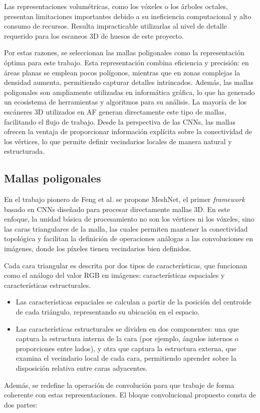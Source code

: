Las representaciones volumétricas, como los vóxeles o los árboles octales, presentan limitaciones importantes debido a su ineficiencia computacional y alto consumo de recursos. Resulta impracticable utilizarlas al nivel de detalle requerido para los escaneos 3D de huesos de este proyecto.

Por estas razones, se seleccionan las mallas poligonales como la representación óptima para este trabajo. Esta representación combina eficiencia y precisión: en áreas planas se emplean pocos polígonos, mientras que en zonas complejas la densidad aumenta, permitiendo capturar detalles intrincados. Además, las mallas poligonales son ampliamente utilizadas en informática gráfica, lo que ha generado un ecosistema de herramientas y algoritmos para su análisis. La mayoría de los escáneres 3D utilizados en AF generan directamente este tipo de mallas, facilitando el flujo de trabajo. Desde la perspectiva de las CNNs, las mallas ofrecen la ventaja de proporcionar información explícita sobre la conectividad de los vértices, lo que permite definir vecindarios locales de manera natural y estructurada.

\subsection{Mallas poligonales}
\label{section3:meshes}

En el trabajo pionero de Feng et al. \cite{feng2019meshnet} se propone MeshNet, el primer \textit{framework} basado en CNNs diseñado para procesar directamente mallas 3D. En este enfoque, la unidad básica de procesamiento no son los vértices ni los vóxeles, sino las caras triangulares de la malla, las cuales permiten mantener la conectividad topológica y facilitan la definición de operaciones análogas a las convoluciones en imágenes, donde los píxeles tienen vecindarios bien definidos.

Cada cara triangular es descrita por dos tipos de características, que funcionan como el análogo del valor RGB en imágenes: características espaciales y características estructurales.
\begin{itemize}
    \item Las características espaciales se calculan a partir de la posición del centroide de cada triángulo, representando su ubicación en el espacio.
    \item Las características estructurales se dividen en dos componentes: una que captura la estructura interna de la cara (por ejemplo, ángulos internos o proporciones entre lados), y otra que captura la estructura externa, que examina el vecindario local de cada cara, permitiendo aprender sobre la disposición relativa entre caras adyacentes.
\end{itemize}
Además, se redefine la operación de convolución para que trabaje de forma coherente con estas representaciones. El bloque convolucional propuesto consta de dos partes:

